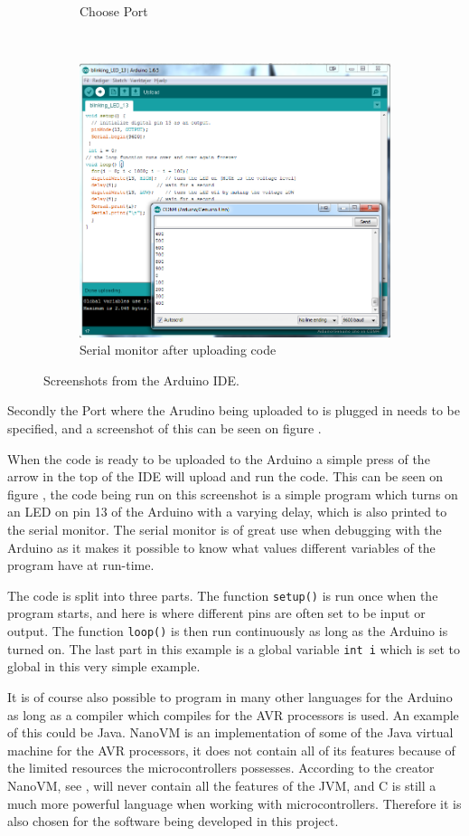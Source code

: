\begin{figure}
\begin{subfigure}{0.47\linewidth}
\caption{Choose Port}
\label{fig:choose_port}
\end{subfigure}\\[1ex]
\begin{subfigure}{\linewidth}
\centering
\includegraphics[width=0.7\linewidth]{Figures/SerialMonitor}
\caption{Serial monitor after uploading code}
\label{fig:serial_monitor}
\end{subfigure}
\caption{Screenshots from the Arduino IDE.}
\label{fig:ArduinoScreenshots}
\end{figure}


Secondly the Port where the Arudino being uploaded to is plugged in needs to be specified, and a screenshot of this can be seen on figure .

When the code is ready to be uploaded to the Arduino a simple press of the arrow in the top of the IDE will upload and run the code. 
This can be seen on figure , the code being run on this screenshot is a simple program which turns on an LED on pin 13 of the Arduino with a varying delay, which is also printed to the serial monitor.
The serial monitor is of great use when debugging with the Arduino as it makes it possible to know what values different variables of the program have at run-time.

The code is split into three parts.
The function \texttt{setup()} is run once when the program starts, and here is where different pins are often set to be input or output.
The function \texttt{loop()} is then run continuously as long as the Arduino is turned on. 
The last part in this example is a global variable \texttt{int i} which is set to global in this very simple example.

It is of course also possible to program in many other languages for the Arduino as long as a compiler which compiles for the AVR processors is used.
An example of this could be Java.
NanoVM is an implementation of some of the Java virtual machine for the AVR processors, it does not contain all of its features because of the limited resources the microcontrollers possesses. 
According to the creator NanoVM, see \cite{NanoVM}, will never contain all the features of the JVM, and C is still a much more powerful language when working with microcontrollers. 
Therefore it is also chosen for the software being developed in this project.
